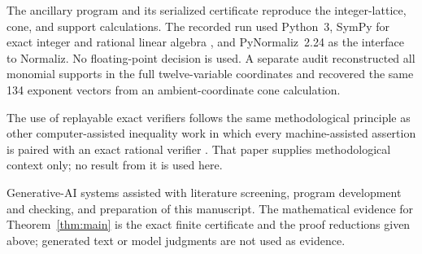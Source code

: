 \documentclass[11pt]{article}
\theoremstyle{definition}
\begin{document}
The ancillary program
 and its serialized certificate
 reproduce the integer-lattice,
cone, and support calculations.  The recorded run used Python~3, SymPy for
exact integer and rational linear algebra \cite{MeurerEtAl2017}, and
PyNormaliz~2.24 as the interface to Normaliz.  No floating-point decision is
used.  A separate audit reconstructed all monomial supports in the full
twelve-variable coordinates and recovered the same 134 exponent vectors
from an ambient-coordinate cone calculation.

The use of replayable exact verifiers follows the same methodological
principle as other computer-assisted inequality work in which every
machine-assisted assertion is paired with an exact rational verifier
\cite[Section~14]{Zeng2026Lens}.  That paper supplies methodological context
only; no result from it is used here.

Generative-AI systems assisted with literature screening, program
development and checking, and preparation of this manuscript.  The
mathematical evidence for Theorem~\ref{thm:main} is the exact finite
certificate and the proof reductions given above; generated text or model
judgments are not used as evidence.



\end{document}
